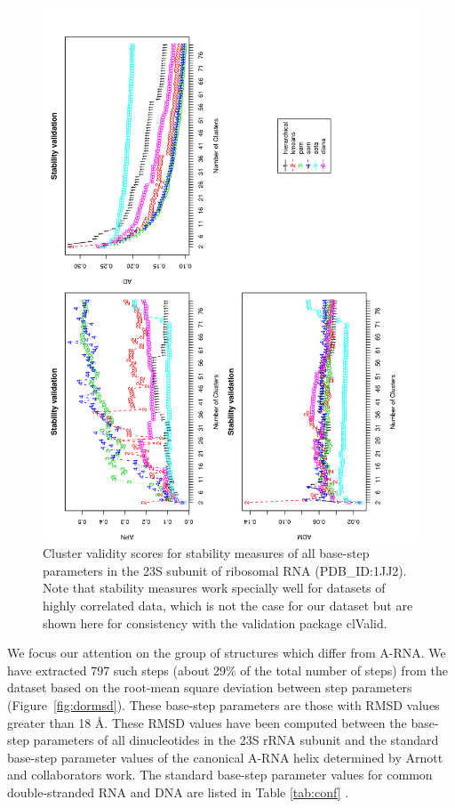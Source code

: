\begin{figure}
 \centering
\includegraphics[angle=0, scale=0.34]{Chapter2/STval_sta.png}
\caption{Cluster  validity  scores   for  stability  measures  of  all
  base-step   parameters  in   the  23S   subunit  of   ribosomal  RNA
  (PDB\_ID:1JJ2).  Note that stability measures work specially well for
  datasets of  highly correlated data, which  is not the  case for our
  dataset  but are  shown  here for  consistency  with the  validation
  package clValid.}
 \label{fig:stability}
\end{figure}

We focus  our attention on the  group of structures  which differ from
A-RNA.   We have extracted  797 such  steps (about  29\% of  the total
number  of steps)  from  the  dataset based  on  the root-mean  square
deviation  between step  parameters  (Figure~\ref{fig:dormsd}).  These
base-step parameters are  those with RMSD values greater  than 18 \AA.
These RMSD values have  been computed between the base-step parameters
of  all  dinucleotides  in  the  23S rRNA  subunit  and  the  standard
base-step parameter values of  the canonical A-RNA helix determined by
Arnott   and  collaborators   \cite{arnott1973}  work.   The  standard
base-step parameter values for  common double-stranded RNA and DNA are
listed in Table \ref{tab:conf} .

